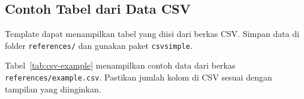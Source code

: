 \subsection{Contoh Tabel dari Data CSV}

Template dapat menampilkan tabel yang diisi dari berkas CSV. Simpan data di folder \texttt{references/} dan gunakan paket \texttt{csvsimple}.

\begin{table}[H]
\centering
\caption{Contoh tabel dari data CSV}
\label{tab:csv-example}
\end{table}

Tabel~\ref{tab:csv-example} menampilkan contoh data dari berkas \texttt{references/example.csv}. Pastikan jumlah kolom di CSV sesuai dengan tampilan yang diinginkan.
